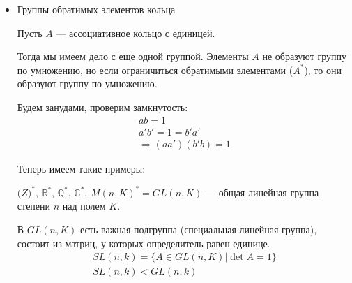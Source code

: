 \begin{itemize}
Из курса дискретной математики известно, что замена представителей классов на других представителей тех же классов не влияет на результат операций.

\begin{theorem-non}
  $(\mathbb{Z}/m \mathbb{Z}, +, \cdot)$ --- коммутативное ассоциативное кольцо с единицей.

  \begin{proof}
    Рутинная проверка, тривиально.
  \end{proof}
\end{theorem-non}

\notice
Можно обобщить построение кольца классов вычетов до любого коммутативного кольца. 

$R$ --- коммутативное кольцо, $f\in R$, $\stackrel{f}{\equiv}$ --- отношение сравнимости по модулю элемента $f$.

$R/(f) = R/\stackrel{f}{\equiv}$ --- факторкольцо. 

В частности можно самостоятельно обдумать такое: 

\begin{itemize}
  \item $\mathbb{R}[X]/(X^2 + 1)$ --- легко отождествляется с полем комплексных чисел. 
  \item $R$ --- коммутативное кольцо, $I\subset R$ --- идеал в нем. Тогда $a \stackrel{I}{\equiv} b \Leftrightarrow a - b \in I$
\end{itemize} 

\item Группы обратимых элементов кольца

Пусть $A$ --- ассоциативное кольцо с единицей. 

Тогда мы имеем дело с еще одной группой. Элементы $A$ не образуют группу по умножению, но если ограничиться обратимыми элементами ($A^*$), то они образуют группу по умножению. 

Будем занудами, проверим замкнутость: 
\begin{gather*}
  ab = 1 \\
  a'b' = 1 = b'a' \\
  \Rightarrow (aa')(b'b) = 1  
\end{gather*}

Теперь имеем такие примеры: 

$\mathbb(Z)^*$, $\mathbb{R}^*$, $\mathbb{Q}^*$, $\mathbb{C}^*$, $M(n, K)^* = GL(n, K)$ --- общая линейная группа степени $n$ над полем $K$.

В $GL(n, K)$ есть важная подгруппа (специальная линейная группа), состоит из матриц, у которых определитель равен единице. 
\begin{gather*}
  SL(n, k) = \{ A \in GL(n, K) | \det{A} = 1 \} \\
  SL(n, k) < GL(n, k)
\end{gather*}


\end{itemize}
